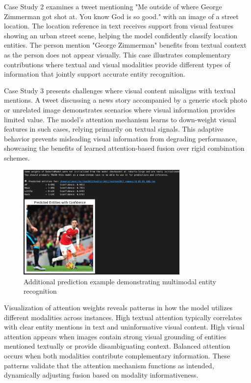 \documentclass[12pt,a4paper]{report}
\begin{document}
Case Study 2 examines a tweet mentioning "Me outside of where George Zimmerman got shot at. You know God is so good." with an image of a street location. The location reference in text receives support from visual features showing an urban street scene, helping the model confidently classify location entities. The person mention "George Zimmerman" benefits from textual context as the person does not appear visually. This case illustrates complementary contributions where textual and visual modalities provide different types of information that jointly support accurate entity recognition.

Case Study 3 presents challenges where visual content misaligns with textual mentions. A tweet discussing a news story accompanied by a generic stock photo or unrelated image demonstrates scenarios where visual information provides limited value. The model's attention mechanism learns to down-weight visual features in such cases, relying primarily on textual signals. This adaptive behavior prevents misleading visual information from degrading performance, showcasing the benefits of learned attention-based fusion over rigid combination schemes.

\begin{figure}[H]
\centering
\includegraphics[width=0.75\textwidth]{prediction2.png}
\caption{Additional prediction example demonstrating multimodal entity recognition}
\label{fig:prediction2}
\end{figure}

Visualization of attention weights reveals patterns in how the model utilizes different modalities across instances. High textual attention typically correlates with clear entity mentions in text and uninformative visual content. High visual attention appears when images contain strong visual grounding of entities mentioned textually or provide disambiguating context. Balanced attention occurs when both modalities contribute complementary information. These patterns validate that the attention mechanism functions as intended, dynamically adjusting fusion based on modality informativeness.
\end{document}
